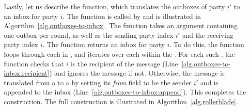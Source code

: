 Lastly, let us describe the \outboxesToInbox function, which translates the outboxes
of party $i'$ to an inbox for party $i$. The function is called by \prepareEmulationInputs
and is illustrated in Algorithm~\ref{alg.outboxes-to-inbox}. The function takes an
\outboxes argument containing one outbox per round, as well as the sending party index
$i'$ and the receiving party index $i$. The function returns an inbox for party $i$.
To do this, the function loops through each \outbox in \outboxes, and iterates over each
\netout within the \outbox. For each such \netout, the function checks that $i$ is the
recipient of the message (Line~\ref{alg.outboxes-to-inbox:recipient}) and ignores the
message if not. Otherwise, the message is translated from a \netout to a \netin
by setting its \emph{from} field to be the sender $i'$ and is
appended to the inbox (Line~\ref{alg.outboxes-to-inbox:append}).
This completes the construction. The full construction is illustrated in
Algorithm~\ref{alg.rollerblade}.

